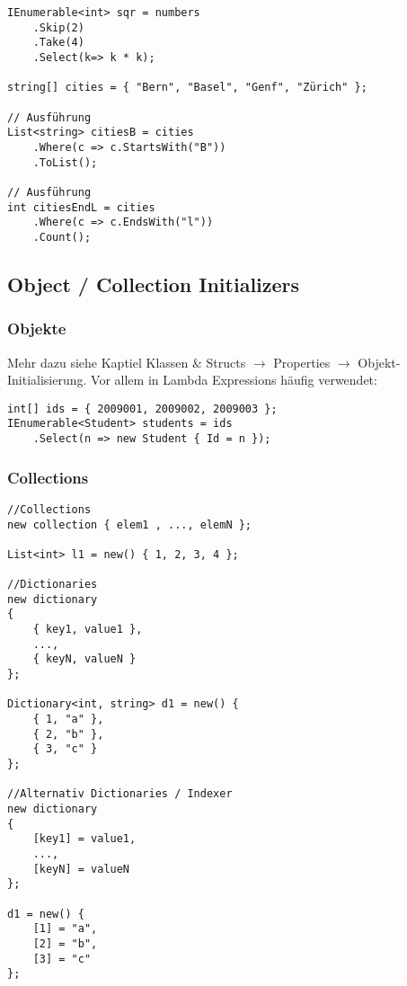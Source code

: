 \begin{multicols*}{2}
\begin{lstlisting}
IEnumerable<int> sqr = numbers
    .Skip(2)
    .Take(4)
    .Select(k=> k * k);

string[] cities = { "Bern", "Basel", "Genf", "Zürich" };

// Ausführung
List<string> citiesB = cities 
    .Where(c => c.StartsWith("B")) 
    .ToList();

// Ausführung
int citiesEndL = cities
    .Where(c => c.EndsWith("l"))
    .Count();
\end{lstlisting}

\subsection{Object / Collection Initializers}
\subsubsection{Objekte}
Mehr dazu siehe Kaptiel Klassen \& Structs $\rightarrow$ Properties $\rightarrow$ Objekt-Initialisierung.
Vor allem in Lambda Expressions häufig verwendet:
\begin{lstlisting}
int[] ids = { 2009001, 2009002, 2009003 };
IEnumerable<Student> students = ids
    .Select(n => new Student { Id = n });
\end{lstlisting}
\subsubsection{Collections}
\begin{lstlisting}
//Collections
new collection { elem1 , ..., elemN };

List<int> l1 = new() { 1, 2, 3, 4 };

//Dictionaries
new dictionary
{ 
    { key1, value1 },
    ...,
    { keyN, valueN } 
};

Dictionary<int, string> d1 = new() {
    { 1, "a" },
    { 2, "b" },
    { 3, "c" }
};

//Alternativ Dictionaries / Indexer
new dictionary
{ 
    [key1] = value1, 
    ...,
    [keyN] = valueN 
};

d1 = new() {
    [1] = "a",
    [2] = "b",
    [3] = "c"
};
\end{lstlisting}


\end{multicols*}
